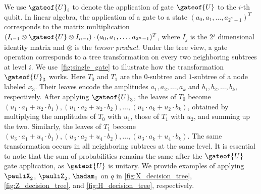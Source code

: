 \figGeneralsinglequbitgate
We use $\gateof{U}_i$ to denote the application of gate $\gateof{U}$ to the
$i$-th qubit. In linear algebra, the application of a gate to a state
$(a_0,a_1,\ldots, a_{2^n-1})^T$ corresponds to the matrix multiplication
$(I_{i-1}\otimes\gateof{U} \otimes I_{n-i}) \cdot (a_0,a_1,\ldots, a_{2^n-1})^T$, where $I_j$ is the $2^j$ dimensional identity matrix and $\otimes$ is the \emph{tensor product}. Under the tree view, a gate operation corresponds to a tree transformation on every two neighboring subtrees at level $i$. We use~\cref{fig:single_gate} to illustrate how the transformation $\gateof{U}_3$ works. Here $T_0$ and $T_1$ are the $0$-subtree and $1$-subtree of a node labeled $x_3$. Their leaves encode the amplitudes $a_1, a_2,\ldots, a_k$ and $b_1, b_2,\ldots, b_k$, respectively.
After applying $\gateof{U}_3$, the leaves of $T_0$ become $(u_1\cdot
a_1+u_2\cdot b_1), (u_1\cdot a_2+u_2\cdot b_2),\ldots, (u_1\cdot a_k+u_2\cdot b_k)$, obtained by multiplying the amplitudes of $T_0$ with $u_1$, those of $T_1$ with $u_2$, and summing up the two. Similarly, the leaves of $T_1$
become $(u_3\cdot a_1+u_4\cdot b_1), (u_3\cdot a_2+u_4\cdot b_2),\ldots,
(u_3\cdot a_k+u_4\cdot b_k)$. The same transformation occurs in all neighboring subtrees at the same level.
It is essential to note
that the sum of probabilities remains the same after the $\gateof{U}$ gate application,
as $\gateof{U}$ is unitary. We provide examples of applying $\pauliX_2$,
$\pauliZ_2$, $\hadam_1$ on $q$ in \cref{fig:X_decision_tree}, \cref{fig:Z_decision_tree}, and \cref{fig:H_decision_tree}, respectively.




